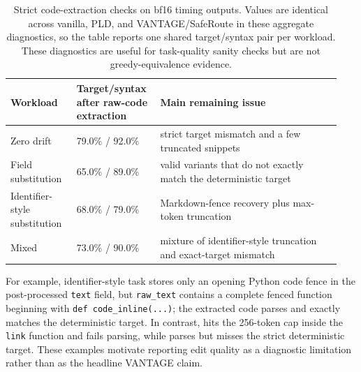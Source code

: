 \documentclass[11pt,a4paper]{article}
\begin{document}
\begin{table}[h]
\centering\scriptsize
\caption{Strict code-extraction checks on bf16 timing outputs. Values are
identical across vanilla, PLD, and VANTAGE/SafeRoute in these aggregate diagnostics,
so the table reports one shared target/syntax pair per workload. These
diagnostics are useful for task-quality sanity checks but are not
greedy-equivalence evidence.}
\label{tab:strict-quality-appendix}
\setlength{\tabcolsep}{3pt}
\begin{tabular}{@{}L{0.19\linewidth}L{0.23\linewidth}L{0.52\linewidth}@{}}
\toprule
Workload & Target/syntax after raw-code extraction & Main remaining issue \\
\midrule
Zero drift & 79.0\% / 92.0\% & strict target mismatch and a few truncated snippets \\
Field substitution & 65.0\% / 89.0\% & valid variants that do not exactly match the deterministic target \\
Identifier-style substitution & 68.0\% / 79.0\% & Markdown-fence recovery plus max-token truncation \\
Mixed & 73.0\% / 90.0\% & mixture of identifier-style truncation and exact-target mismatch \\
\bottomrule
\end{tabular}
\end{table}

For example, identifier-style task
 stores only
an opening Python code fence in the post-processed \texttt{text} field, but
\texttt{raw\_text} contains a complete fenced function beginning with
\texttt{def code\_inline(...)}; the extracted code parses and exactly matches
the deterministic target. In contrast,
 hits the 256-token cap
inside the \texttt{link} function and fails parsing, while
 parses but misses the
strict deterministic target. These examples motivate reporting edit quality as
a diagnostic limitation rather than as the headline VANTAGE claim.
\end{document}
